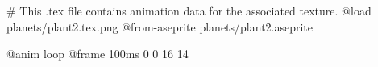 # This .tex file contains animation data for the associated texture.
@load planets/plant2.tex.png
@from-aseprite planets/plant2.aseprite

@anim loop
	@frame 100ms 0 0 16 14
